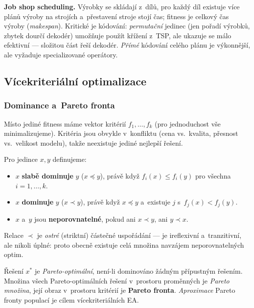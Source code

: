 \documentclass[11pt,a4paper]{article}
\theoremstyle{definition}
\begin{document}
\textbf{Job shop scheduling.} Výrobky se skládají z~dílů, pro každý díl existuje více plánů
výroby na strojích a~přestavení stroje stojí čas; fitness je celkový čas výroby
(\emph{makespan}). Kritické je kódování: \emph{permutační} jedinec (jen pořadí výrobků,
zbytek dourčí dekodér) umožňuje použít křížení z~TSP, ale ukazuje se málo efektivní ---
složitou část řeší dekodér. \emph{Přímé} kódování celého plánu je výkonnější, ale vyžaduje
specializované operátory.

\subsection{Vícekriteriální optimalizace}
\label{sec:moea}

\subsubsection{Dominance a~Pareto fronta}

Místo jediné fitness máme vektor kritérií $f_1,\dots,f_k$ (pro jednoduchost
vše minimalizujeme). Kritéria jsou obvykle v~konfliktu (cena vs.\ kvalita,
přesnost vs.\ velikost modelu), takže neexistuje jediné nejlepší řešení.

\begin{defbox}[Dominance]
Pro jedince $x, y$ definujeme:
\begin{itemize}
\item $x$ \textbf{slabě dominuje} $y$ ($x \preceq y$), právě když
  $f_i(x) \le f_i(y)$ pro všechna $i = 1,\dots,k$.
\item $x$ \textbf{dominuje} $y$ ($x \prec y$), právě když $x \preceq y$
  a~existuje $j$ s~$f_j(x) < f_j(y)$.
\item $x$ a~$y$ jsou \textbf{neporovnatelné}, pokud ani $x \prec y$,
  ani $y \prec x$.
\end{itemize}
Relace $\prec$ je \emph{ostré} (striktní) částečné uspořádání --- je
ireflexivní a~tranzitivní, ale nikoli úplné: proto obecně existuje celá
množina navzájem neporovnatelných optim.
\end{defbox}

\begin{defbox}
Řešení $x^*$ je \emph{Pareto-optimální}, není-li dominováno žádným
přípustným řešením. Množina všech Pareto-optimálních řešení v~prostoru
proměnných je \emph{Pareto množina}, její obraz v~prostoru kritérií je
\textbf{Pareto fronta}. \emph{Aproximace} Pareto fronty populací je cílem
vícekriteriálních EA.
\end{defbox}
\end{document}

